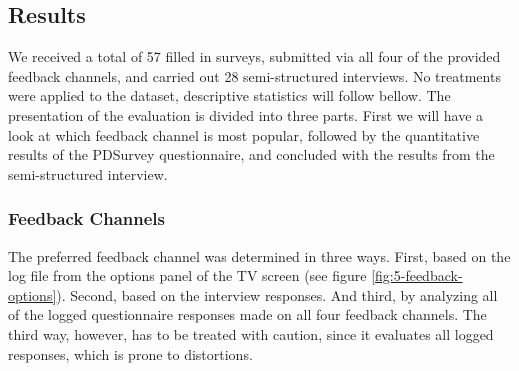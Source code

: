 


\clearpage
\subsection{Results}


	We received a total of 57 filled in surveys, submitted via all four of the provided feedback channels, and carried out 28 semi-structured interviews. No treatments were applied to the dataset, descriptive statistics will follow bellow. The presentation of the evaluation is divided into three parts. First we will have a look at which feedback channel is most popular, followed by the quantitative results of the PDSurvey questionnaire, and concluded with the results from the semi-structured interview. 







	\subsubsection{Feedback Channels}
	\label{5:results:feedback-channels}

	The preferred feedback channel was determined in three ways. First, based on the log file from the options panel of the TV screen (see figure \ref{fig:5-feedback-options}). Second, based on the interview responses. And third, by analyzing all of the logged questionnaire responses made on all four feedback channels. The third way, however, has to be treated with caution, since it evaluates all logged responses, which is prone to distortions.

